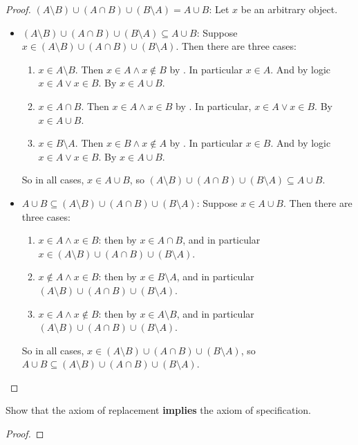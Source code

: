 \begin{proof}
\((A \setminus B) \cup (A \cap B) \cup (B \setminus A) = A \cup B\): Let \(x\) be an arbitrary object.
\begin{itemize}
    \item \((A \setminus B) \cup (A \cap B) \cup (B \setminus A) \subseteq A \cup B\): Suppose \(x \in (A \setminus B) \cup (A \cap B) \cup (B \setminus A)\). Then there are three cases:
        \begin{enumerate}
            \item \(x \in A \setminus B\). Then \(x \in A \land x \notin B\) by . In particular \(x \in A\). And by logic \(x \in A \lor x \in B\). By  \(x \in A \cup B\).
            \item \(x \in A \cap B\). Then \(x \in A \land x \in B\) by . In particular, \(x \in A \lor x \in B\). By  \(x \in A \cup B\).
            \item \(x \in B \setminus A\). Then \(x \in B \land x \notin A\) by . In particular \(x \in B\). And by logic \(x \in A \lor x \in B\). By  \(x \in A \cup B\).
        \end{enumerate}
        So in all cases, \(x \in A \cup B\), so \((A \setminus B) \cup (A \cap B) \cup (B \setminus A) \subseteq A \cup B\).
    \item \(A \cup B \subseteq (A \setminus B) \cup (A \cap B) \cup (B \setminus A)\): Suppose \(x \in A \cup B\). Then there are three cases:
        \begin{enumerate}
            \item \(x \in A \land x \in B\): then by  \(x \in A \cap B\), and in particular \(x \in (A \setminus B) \cup (A \cap B) \cup (B \setminus A)\).
            \item \(x \notin A \land x \in B\): then by  \(x \in B \setminus A\), and in particular \((A \setminus B) \cup (A \cap B) \cup (B \setminus A)\).
            \item \(x \in A \land x \notin B\): then by  \(x \in A \setminus B\), and in particular \((A \setminus B) \cup (A \cap B) \cup (B \setminus A)\).
        \end{enumerate}
        So in all cases, \(x \in (A \setminus B) \cup (A \cap B) \cup (B \setminus A)\), so \(A \cup B \subseteq (A \setminus B) \cup (A \cap B) \cup (B \setminus A)\).
\end{itemize}
\end{proof}

\begin{exercise}\label{exercise 3.1.11}
Show that the axiom of replacement \textbf{implies} the axiom of specification.
\end{exercise}

\begin{proof}
\end{proof}